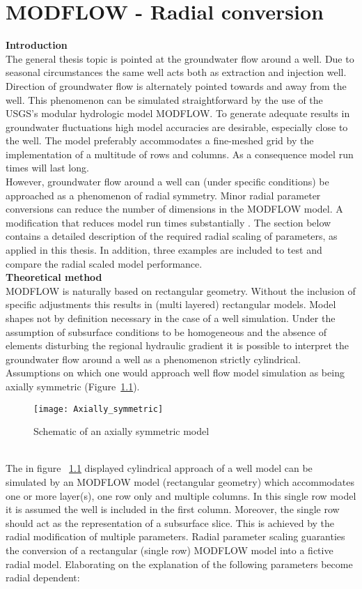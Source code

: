 \chapter{MODFLOW - Radial conversion}
\label{MODFLOW_radial}

\textbf{Introduction} \\
The general thesis topic is pointed at the groundwater flow around a well. Due to seasonal circumstances the same well acts both as extraction and injection well. Direction of groundwater flow is alternately pointed towards and away from the well. This phenomenon can be simulated straightforward by the use of the USGS's modular hydrologic model MODFLOW. To generate adequate results in groundwater fluctuations high model accuracies are desirable, especially close to the well. The model preferably accommodates a fine-meshed grid by the implementation of a multitude of rows and columns. As a consequence model run times will last long. \\ However, groundwater flow around a well can (under specific conditions) be approached as a phenomenon of radial symmetry. Minor radial parameter conversions can reduce the number of dimensions in the MODFLOW model. A modification that reduces model run times substantially \citep{Langevin2008}. The section below contains a detailed description of the required radial scaling of parameters, as applied in this thesis. In addition, three examples are included to test and compare the radial scaled model performance.  
\bigskip \\
\textbf{Theoretical method} \\
MODFLOW is naturally based on rectangular geometry. Without the inclusion of specific adjustments this results in (multi layered) rectangular models. Model shapes not by definition necessary in the case of a well simulation. Under the assumption of subsurface conditions to be homogeneous and the absence of elements disturbing the regional hydraulic gradient it is possible to interpret the groundwater flow around a well as a phenomenon strictly cylindrical. Assumptions on which one would approach well flow model simulation as being axially symmetric (Figure~\ref{fig:Axially}).
\begin{figure}[h!]
 \centering\texttt{[image: Axially\_symmetric]}
 \captionsetup{justification=centering}
 \caption{Schematic of an axially symmetric model \citep{Langevin2008}}
 \label{fig:Axially}
\end{figure} 
\bigskip \\
The in figure ~\ref{fig:Axially} displayed cylindrical approach of a well model can be simulated by an MODFLOW model (rectangular geometry) which accommodates one or more layer(s), one row only and multiple columns. In this single row model it is assumed the well is included in the first column. Moreover, the single row should act as the representation of a subsurface slice. This is achieved by the radial modification of multiple parameters. Radial parameter scaling guaranties the conversion of a rectangular (single row) MODFLOW model into a fictive radial model. Elaborating on the explanation of \citet{Langevin2008} the following parameters become radial dependent:    
  

